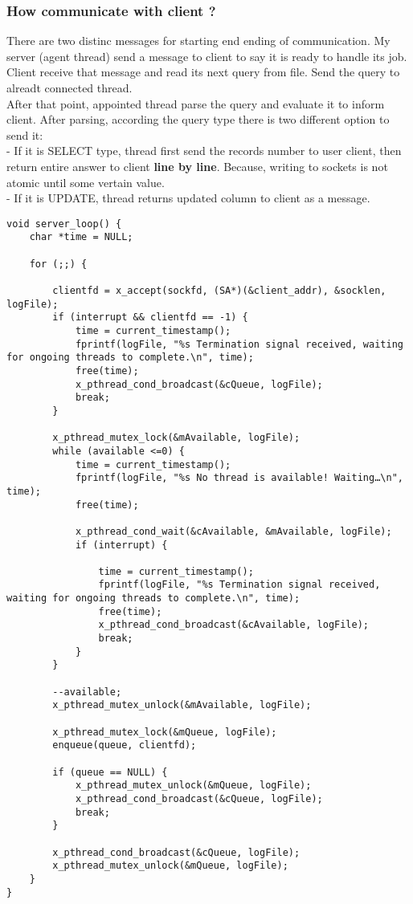 \documentclass{article}
\begin{document}
\subsubsection{How communicate with client ?}
There are two distinc messages for starting end ending of communication. My server (agent thread) send a message to client to say it is ready to handle its job. Client receive that message and read its next query from file. Send the query to alreadt connected thread.\\
After that point, appointed thread parse the query and evaluate it to inform client. After parsing, according the query type there is two different option to send it:\\
- If it is SELECT type, thread first send the records number to user client, then return entire answer to client \textbf{line by line}. Because, writing to sockets is not atomic until some vertain value.\\
- If it is UPDATE, thread returns updated column to client as a message.\\
\begin{lstlisting}[style=CStyle]
void server_loop() {
    char *time = NULL;

    for (;;) {

        clientfd = x_accept(sockfd, (SA*)(&client_addr), &socklen, logFile);
        if (interrupt && clientfd == -1) {
            time = current_timestamp();
            fprintf(logFile, "%s Termination signal received, waiting for ongoing threads to complete.\n", time);
            free(time);
            x_pthread_cond_broadcast(&cQueue, logFile);
            break;
        }
        
        x_pthread_mutex_lock(&mAvailable, logFile);
        while (available <=0) {
            time = current_timestamp();
            fprintf(logFile, "%s No thread is available! Waiting…\n", time);
            free(time);

            x_pthread_cond_wait(&cAvailable, &mAvailable, logFile);
            if (interrupt) {

                time = current_timestamp();
                fprintf(logFile, "%s Termination signal received, waiting for ongoing threads to complete.\n", time);
                free(time);
                x_pthread_cond_broadcast(&cAvailable, logFile);
                break;
            }
        }

        --available;
        x_pthread_mutex_unlock(&mAvailable, logFile);
        
        x_pthread_mutex_lock(&mQueue, logFile);
        enqueue(queue, clientfd);

        if (queue == NULL) {
            x_pthread_mutex_unlock(&mQueue, logFile);
            x_pthread_cond_broadcast(&cQueue, logFile);
            break;  
        }
        
        x_pthread_cond_broadcast(&cQueue, logFile);
        x_pthread_mutex_unlock(&mQueue, logFile);
    }
}
\end{lstlisting}
\end{document}

